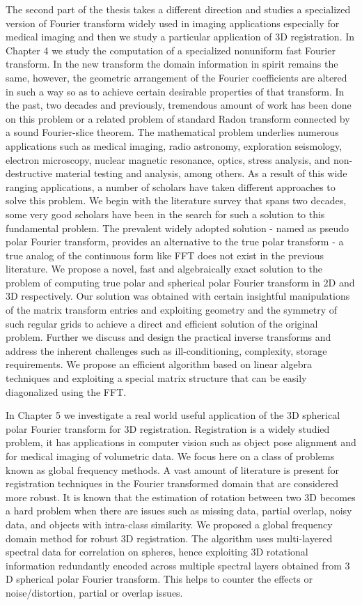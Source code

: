 \documentclass{UCF_ETD}
\begin{document}
The second part of the thesis takes a different direction and studies a specialized version of Fourier transform widely used in imaging applications especially for medical imaging and then we study a particular application of 3D registration. In Chapter 4 we study the computation of a specialized nonuniform fast Fourier transform. In the new transform the domain information in spirit remains the same, however, the geometric arrangement of the Fourier coefficients are altered in such a way so as to achieve certain desirable properties of that transform. In the past, two decades and previously, tremendous amount of work has been done on this problem or a related problem of standard Radon transform connected by a sound Fourier-slice theorem. The mathematical problem underlies numerous applications such as medical imaging, radio astronomy, exploration seismology, electron microscopy, nuclear magnetic resonance, optics, stress analysis, and non-destructive material testing and analysis, among others. As a result of this wide ranging applications, a number of scholars have taken different approaches to solve this problem. We begin with the literature survey that spans two decades, some very good scholars have been in the search for such a solution to this fundamental problem. The prevalent widely adopted solution - named as pseudo polar Fourier transform, provides an alternative to the true polar transform - a true analog of the continuous form like FFT does not exist in the previous literature. We propose a novel, fast and algebraically exact solution to the problem of computing true polar and spherical polar Fourier transform in $2$D and $3$D respectively. Our solution was obtained with certain insightful manipulations of the matrix transform entries and exploiting geometry and the symmetry of such regular grids to achieve a direct and efficient solution of the original problem. Further we discuss and design the practical inverse transforms and address the inherent challenges such as ill-conditioning, complexity, storage requirements. We propose an efficient algorithm based on linear algebra techniques and exploiting a special matrix structure that can be easily diagonalized using the FFT. 

In Chapter 5 we investigate a real world useful application of the $3$D spherical polar Fourier transform for $3$D registration. Registration is a widely studied problem, it has applications in computer vision such as object pose alignment and for medical imaging of volumetric data. We focus here on a class of problems known as global frequency methods. A vast amount of literature is present for registration techniques in the Fourier transformed domain that are considered more robust. It is known that the estimation of rotation between two $3$D becomes a hard problem when there are issues such as missing data, partial overlap, noisy data, and objects with intra-class similarity. We proposed a global frequency domain method for robust $3$D registration. The algorithm uses multi-layered spectral data for correlation on spheres, hence exploiting $3$D rotational information redundantly encoded across multiple spectral layers obtained from $3$D spherical polar Fourier transform. This helps to counter the effects or noise/distortion, partial or overlap issues. 
\end{document}
